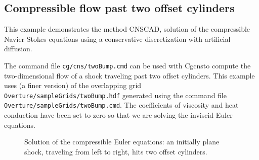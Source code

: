 \documentclass{article}
\newcommand{\cnsDocDir}{../cns}
\newcommand{\Solver}{Cgcns}
\begin{document}
\clearpage
\subsection{Compressible flow past two offset cylinders}

This example demonstrates the method CNSCAD, solution of the compressible Navier-Stokes equations
using a conservative discretization with artificial diffusion.

The command file {\tt cg/cns/twoBump.cmd} can be used with \Solver to compute the
two-dimensional flow of a shock traveling past two offset cylinders. 
This example uses (a finer version) of the overlapping grid {\tt Overture/\-sampleGrids/\-twoBump.hdf}  generated
using the command file {\tt Overture/\-sampleGrids/\-twoBump.cmd}.
The coefficients of viscosity and heat conduction have been set to zero so that we
are solving the inviscid Euler equations.

{
\newcommand{\figWidth}{10cm}
\newcommand{\trimfig}[2]{\trimPlot{#1}{#2}{.12}{.15}{.35}{.325}}
\begin{figure}[hbt]
\begin{center}
\end{center}
\caption{Solution of the compressible Euler equations: an initially plane shock, traveling from left to right,
    hits two offset cylinders.}
  \label{fig:cylinder}
\end{figure}
}


\end{document}
